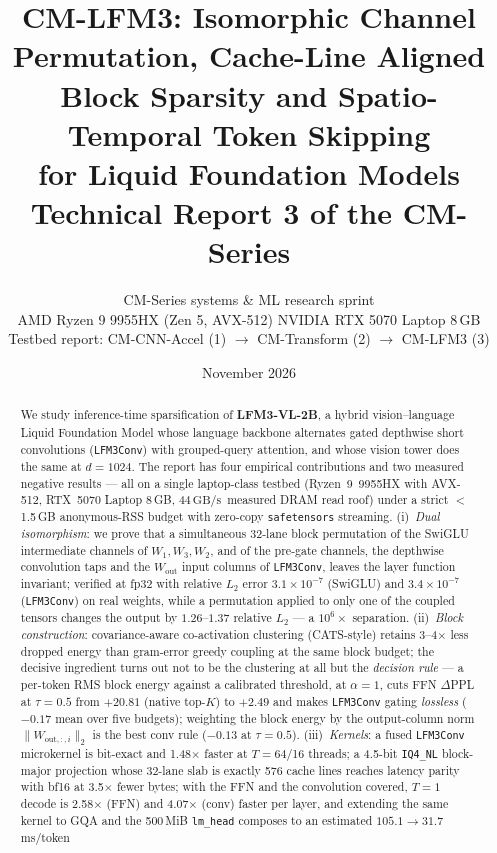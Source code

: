 \documentclass[11pt]{article}
\title{\vspace{-1.2cm}\textbf{CM-LFM3: Isomorphic Channel Permutation, Cache-Line Aligned\\ Block Sparsity and Spatio-Temporal Token Skipping\\ for Liquid Foundation Models}\\[2mm]
\large Technical Report 3 of the CM-Series}
\author{CM-Series systems \& ML research sprint\\
\small AMD Ryzen 9 9955HX (Zen 5, AVX-512) \textperiodcentered{} NVIDIA RTX 5070 Laptop 8\,GB\\
\small Testbed report: CM-CNN-Accel (1) $\rightarrow$ CM-Transform (2) $\rightarrow$ CM-LFM3 (3)}
\date{November 2026}
\newcommand{\Wout}{\ensuremath{W_{\mathrm{out}}}}
\newcommand{\code}[1]{\texttt{\small #1}}
\newcommand{\gbps}{\ensuremath{\,\mathrm{GB/s}}}
\begin{document}
\maketitle
\vspace{-6mm}
\begin{abstract}
\noindent
We study inference-time sparsification of \textbf{LFM3-VL-2B}, a hybrid vision--language
Liquid Foundation Model whose language backbone alternates gated depthwise short
convolutions (\code{LFM3Conv}) with grouped-query attention, and whose vision tower does
the same at $d{=}1024$. The report has four empirical contributions and two measured negative
results --- all on a single laptop-class testbed (Ryzen~9~9955HX with AVX-512,
RTX~5070 Laptop 8\,GB, 44\gbps\ measured DRAM read roof) under a strict
$<$1.5\,GB anonymous-RSS budget with zero-copy \code{safetensors} streaming.
(i)~\emph{Dual isomorphism}: we prove that a simultaneous 32-lane block permutation of
the SwiGLU intermediate channels of $W_1,W_3,W_2$, and of the pre-gate channels, the
depthwise convolution taps and the \Wout{} input columns of \code{LFM3Conv}, leaves the
layer function invariant; verified at fp32 with relative $L_2$ error $3.1\times10^{-7}$
(SwiGLU) and $3.4\times10^{-7}$ (\code{LFM3Conv}) on real weights, while a permutation
applied to only one of the coupled tensors changes the output by $1.26$--$1.37$ relative
$L_2$ --- a $10^{6}\times$ separation. (ii)~\emph{Block construction}: covariance-aware
co-activation clustering (CATS-style) retains 3--4$\times$ less dropped energy than
gram-error greedy coupling at the same block budget; the decisive ingredient turns out
not to be the clustering at all but the \emph{decision rule} --- a per-token RMS block
energy against a calibrated threshold, at $\alpha{=}1$, cuts FFN $\Delta$PPL at
$\tau{=}0.5$ from $+20.81$ (native top-$K$) to $+2.49$ and makes \code{LFM3Conv} gating
\emph{lossless} ($-0.17$ mean over five budgets); weighting the block energy by the
output-column norm $\|W_{\text{out},:,i}\|_2$ is the best conv rule ($-0.13$ at
$\tau{=}0.5$). (iii)~\emph{Kernels}:
a fused \code{LFM3Conv} microkernel is bit-exact and 1.48$\times$ faster at
$T{=}64$/16 threads; a 4.5-bit \code{IQ4\_NL} block-major projection whose 32-lane slab
is exactly 576 cache lines reaches latency parity with bf16 at 3.5$\times$ fewer bytes;
with the FFN and the convolution covered, $T{=}1$ decode is 2.58$\times$ (FFN) and
4.07$\times$ (conv) faster per layer, and extending the same kernel to GQA and the
500\,MiB \code{lm\_head} composes to an estimated $105.1\rightarrow31.7$\,ms/token

\end{abstract}
\end{document}
